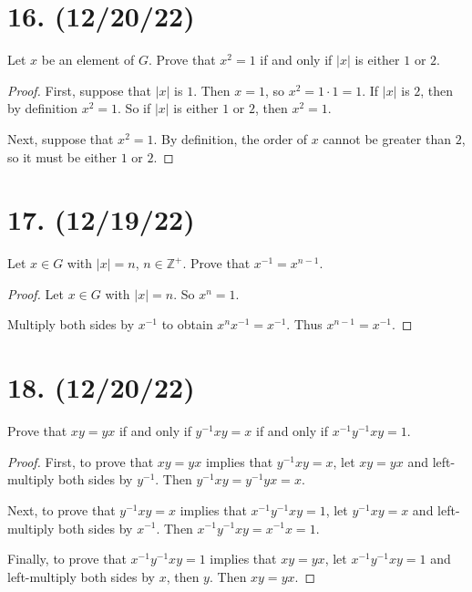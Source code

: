 \documentclass{article}
\begin{document}
\section*{16. (12/20/22)}

Let $x$ be an element of $G$. Prove that $x^2 = 1$ if and only if $|x|$ is either $1$ or $2$.

\begin{proof}
      First, suppose that $|x|$ is $1$. Then $x = 1$, so $x^2 = 1 \cdot 1 = 1$. If $|x|$ is $2$, then by definition $x^2 = 1$. So if $|x|$ is either $1$ or $2$, then $x^2 = 1$.

      Next, suppose that $x^2 = 1$. By definition, the order of $x$ cannot be greater than $2$, so it must be either $1$ or $2$.
\end{proof}

\section*{17. (12/19/22)}

Let $x \in G$ with $|x| = n$, $n \in \mathbb{Z}^+$. Prove that $x^{-1} = x^{n - 1}$.

\begin{proof}
      Let $x \in G$ with $|x| = n$. So $x^n = 1$.

      Multiply both sides by $x^{-1}$ to obtain $x^n x^{-1} = x^{-1}$. Thus $x^{n - 1} = x^{-1}$.
\end{proof}

\section*{18. (12/20/22)}

Prove that $xy = yx$ if and only if $y^{-1} xy = x$ if and only if $x^{-1} y^{-1} xy = 1$.

\begin{proof}
      First, to prove that $xy = yx$ implies that $y^{-1} xy = x$, let $xy = yx$ and left-multiply both sides by $y^{-1}$. Then $y^{-1} xy = y^{-1} yx = x$.

      Next, to prove that $y^{-1} xy = x$ implies that $x^{-1} y^{-1} xy = 1$, let $y^{-1} xy = x$ and left-multiply both sides by $x^{-1}$. Then $x^{-1} y^{-1} xy = x^{-1} x = 1$.

      Finally, to prove that $x^{-1} y^{-1} xy = 1$ implies that $xy = yx$, let $x^{-1} y^{-1} xy = 1$ and left-multiply both sides by $x$, then $y$. Then $xy = yx$.
\end{proof}
\end{document}
